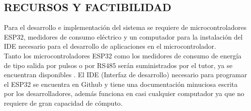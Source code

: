 \documentclass[12pt,letterpaper]{article}
\begin{document}
	\begin{center}		
		\section*{ RECURSOS Y FACTIBILIDAD}	
	\end{center}

	Para el desarrollo e implementación del sistema se requiere de microcontroladores ESP32, medidores de consumo eléctrico y un computador para la instalación del IDE necesario para el desarrollo de aplicaciones en el microcontrolador.\\
	
	Tanto los microcontroladores ESP32 como los medidores de consumo de energía de tipo salida por pulsos o por RS485 serán suministrados por el tutor, ya se encuentran disponibles . El IDE (Interfaz de desarrollo) necesario para programar el ESP32 se encuentra en Github y tiene una documentación minuciosa escrita por los desarrolladores, además funciona en casi cualquier computador ya que no requiere de gran capacidad de cómputo.	\\
	
	
	
\newpage
	


	
\end{document}
